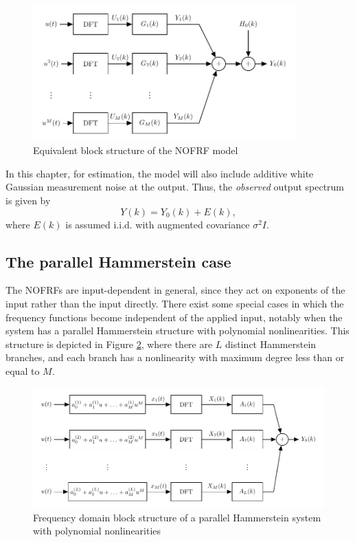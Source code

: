 \begin{figure}[h]
\centering
\includegraphics[width=0.9\textwidth]{Chapter7_NOFRFs/NOFRF_blockstructure}
\caption{Equivalent block structure of the NOFRF model}
\label{fig:NOFRF_ModelStructure_Chap7}
\end{figure}

In this chapter, for estimation, the model will also include additive white Gaussian measurement noise at the output. Thus, the \emph{observed} output spectrum is given by
\begin{equation}
\label{eq:NOFRF_Noisy}
Y(k) = Y_0(k) + E(k),
\end{equation} 
where $E(k)$ is assumed i.i.d. with augmented covariance $\sigma^2 I$.

\subsection{The parallel Hammerstein case}

The NOFRFs are input-dependent in general, since they act on exponents of the input rather than the input directly. There exist some special cases in which the frequency functions become independent of the applied input, notably when the system has a parallel Hammerstein structure with polynomial nonlinearities. This structure is depicted in Figure \ref{fig:PolynomialHamm}, where there are $L$ distinct Hammerstein branches, and each branch has a nonlinearity with maximum degree less than or equal to $M$. 

\begin{figure}[h]
\centering
\includegraphics[width=\textwidth]{Chapter7_NOFRFs/ParallelHammStructure}
\caption{Frequency domain block structure of a parallel Hammerstein system with polynomial nonlinearities}
\label{fig:PolynomialHamm}
\end{figure}

